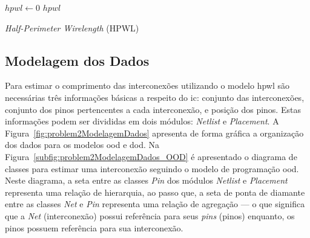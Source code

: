 \begin{algorithm}[h!t]
	\LinesNumbered
    $hpwl \gets 0$\; \label{alg:problem2:var:inithpwl}
  	 \label{alg:problem2:var:endForNets}
  	\Return $hpwl$\; \label{alg:problem2:var:retorno}
	\caption{\textit{Half-Perimeter Wirelength} (HPWL)} 
	\label{alg:problem2}
\end{algorithm}

\subsection{Modelagem dos Dados}
\label{subsec:modelagemDadosProblem2}

Para estimar o comprimento das interconexões utilizando o modelo \ac{hpwl} são necessárias três informações básicas a respeito do \ac{ic}: conjunto das interconexões, conjunto dos pinos pertencentes a cada interconexão, e posição dos pinos.
Estas informações podem ser divididas em dois módulos: \textit{Netlist} e \textit{Placement}.
A Figura~\ref{fig:problem2ModelagemDados} apresenta de forma gráfica a organização dos dados para os modelos \ac{ood} e \ac{dod}.
Na Figura~\ref{subfig:problem2ModelagemDados_OOD} é apresentado o diagrama de classes para estimar uma interconexão seguindo o modelo de programação \ac{ood}.
Neste diagrama, a seta entre as classes \textit{Pin} dos módulos \textit{Netlist} e \textit{Placement} representa uma relação de hierarquia, ao passo que, a seta de ponta de diamante entre as classes \textit{Net} e \textit{Pin} representa  uma relação de agregação --- o que significa que a \textit{Net} (interconexão) possui referência para seus \textit{pins} (pinos) enquanto, os pinos possuem referência para sua interconexão.

